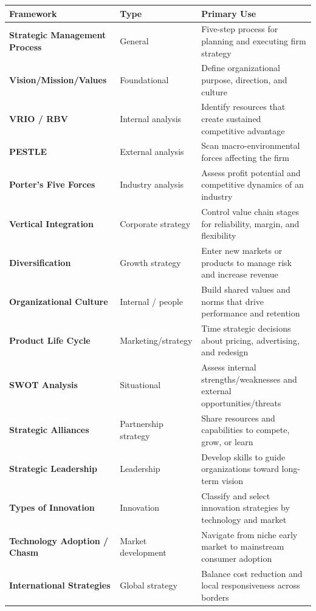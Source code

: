 \documentclass[11pt, letterpaper]{article}
\begin{document}
\begin{center}
\begin{tabular}{>{\bfseries}p{3.8cm} p{3cm} p{6.5cm}}
\toprule
Framework & Type & Primary Use \\
\midrule
Strategic Management Process & General & Five-step process for planning and executing firm strategy \\
\addlinespace
Vision/Mission/Values & Foundational & Define organizational purpose, direction, and culture \\
\addlinespace
VRIO / RBV & Internal analysis & Identify resources that create sustained competitive advantage \\
\addlinespace
PESTLE & External analysis & Scan macro-environmental forces affecting the firm \\
\addlinespace
Porter's Five Forces & Industry analysis & Assess profit potential and competitive dynamics of an industry \\
\addlinespace
Vertical Integration & Corporate strategy & Control value chain stages for reliability, margin, and flexibility \\
\addlinespace
Diversification & Growth strategy & Enter new markets or products to manage risk and increase revenue \\
\addlinespace
Organizational Culture & Internal / people & Build shared values and norms that drive performance and retention \\
\addlinespace
Product Life Cycle & Marketing/strategy & Time strategic decisions about pricing, advertising, and redesign \\
\addlinespace
SWOT Analysis & Situational & Assess internal strengths/weaknesses and external opportunities/threats \\
\addlinespace
Strategic Alliances & Partnership strategy & Share resources and capabilities to compete, grow, or learn \\
\addlinespace
Strategic Leadership & Leadership & Develop skills to guide organizations toward long-term vision \\
\addlinespace
Types of Innovation & Innovation & Classify and select innovation strategies by technology and market \\
\addlinespace
Technology Adoption / Chasm & Market development & Navigate from niche early market to mainstream consumer adoption \\
\addlinespace
International Strategies & Global strategy & Balance cost reduction and local responsiveness across borders \\

\end{tabular}
\end{center}
\end{document}
